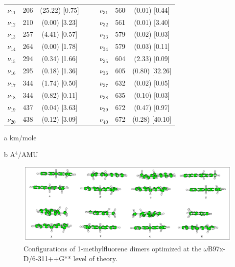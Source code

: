 \begin{table}[H]
\begin{center}
\begin{threeparttable}
\begin{tabular}{c c c c c c c c}
$\nu_{11}$ & 206 & (25.22) [0.75] & & & $\nu_{31}$& 560 & (0.01) [0.44]\\
$\nu_{12}$ & 210 & (0.00) [3.23] & & & $\nu_{32}$& 561 & (0.01) [3.40]\\
$\nu_{13}$ & 257& (4.41) [0.57] & & & $\nu_{33}$& 579 & (0.02) [0.03]\\
$\nu_{14}$ & 264 & (0.00) [1.78] & & & $\nu_{34}$&579 & (0.03) [0.11]\\
$\nu_{15}$ & 294 & (0.34) [1.66] & & & $\nu_{35}$& 604& (2.33) [0.09]\\
$\nu_{16}$ & 295 & (0.18) [1.36] & & & $\nu_{36}$&605 & (0.80) [32.26]\\
$\nu_{17}$ & 344& (1.74) [0.50] & & & $\nu_{37}$&632 & (0.02) [0.05] \\
$\nu_{18}$ & 344& (0.82) [0.11] & & & $\nu_{38}$& 635 & (0.10) [0.03]\\
$\nu_{19}$ & 437 & (0.04) [3.63] & & & $\nu_{39}$&672 & (0.47) [0.97] \\
$\nu_{20}$ & 438 & (0.12) [3.09] & & & $\nu_{40}$&672 & (0.28) [40.10]\\
 	\bottomrule
\end{tabular}

\begin{tablenotes}
	\item[a] km/mole
	\item[b] A$^{4}$/AMU
\end{tablenotes}
\end{threeparttable}
\end{center}
\label{lowfreq-CyclopentaDi}
\end{table}	





\begin{figure}[H]
	\begin{center}
		\includegraphics[scale=0.7]{image/1MCC}
	\end{center}
	\caption{ Configurations of 1-methylfluorene dimers optimized at the $\omega$B97x-D/6-311++G** level of theory. }
\end{figure}


